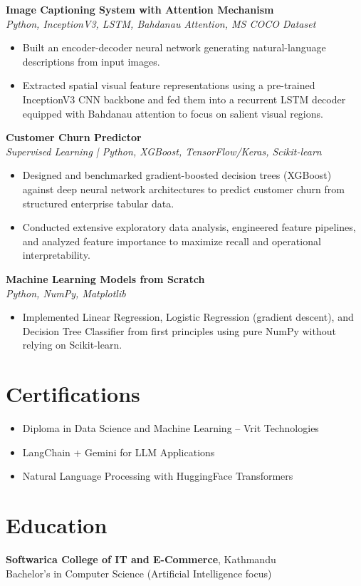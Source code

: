\documentclass[a4paper,10pt]{article}
\begin{document}
\vspace{3pt}
\textbf{Image Captioning System with Attention Mechanism} \\
\textit{Python, InceptionV3, LSTM, Bahdanau Attention, MS COCO Dataset}
\begin{itemize}
    \item Built an encoder-decoder neural network generating natural-language descriptions from input images.
    \item Extracted spatial visual feature representations using a pre-trained InceptionV3 CNN backbone and fed them into a recurrent LSTM decoder equipped with Bahdanau attention to focus on salient visual regions.
\end{itemize}

\vspace{3pt}
\textbf{Customer Churn Predictor} \\
\textit{Supervised Learning | Python, XGBoost, TensorFlow/Keras, Scikit-learn}
\begin{itemize}
    \item Designed and benchmarked gradient-boosted decision trees (XGBoost) against deep neural network architectures to predict customer churn from structured enterprise tabular data.
    \item Conducted extensive exploratory data analysis, engineered feature pipelines, and analyzed feature importance to maximize recall and operational interpretability.
\end{itemize}

\vspace{3pt}
\textbf{Machine Learning Models from Scratch} \\
\textit{Python, NumPy, Matplotlib}
\begin{itemize}
    \item Implemented Linear Regression, Logistic Regression (gradient descent), and Decision Tree Classifier from first principles using pure NumPy without relying on Scikit-learn.
\end{itemize}

\section*{Certifications}
\begin{itemize}
    \item Diploma in Data Science and Machine Learning -- Vrit Technologies
    \item LangChain + Gemini for LLM Applications
    \item Natural Language Processing with HuggingFace Transformers
\end{itemize}

\section*{Education}
\textbf{Softwarica College of IT and E-Commerce}, Kathmandu \\
Bachelor's in Computer Science (Artificial Intelligence focus)
\end{document}

